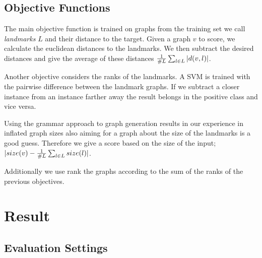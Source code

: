 \documentclass{esannV2}
\begin{document}
\subsection{Objective Functions}

The main objective function is trained on graphs from the training set we call 
\emph{landmarks} $L$ and their distance to the target. 
Given a graph $v$ to score, we calculate the euclidean distances to the landmarks. We then subtract 
the desired distances and give the average of these distances 
$ {1 \over{\#L} }\sum_{l \in L} |d(v,l)|$.

Another objective considers the ranks of the landmarks. A SVM is trained 
with the pairwise difference between the landmark graphs. If we subtract a closer instance
from an instance farther away the result belongs in the positive class and vice versa.

Using the grammar approach to graph generation results in our experience in 
inflated graph sizes also aiming for a graph about the size of the landmarks is a good guess.
Therefore we give a score based on the size of the input; $|size(v) - {1\over{\#L}} \sum_{l \in L} size(l)|$.

Additionally we use rank the graphs according to the sum of the ranks of the previous objectives.

\section{Result}

\subsection{Evaluation Settings}








\end{document}

